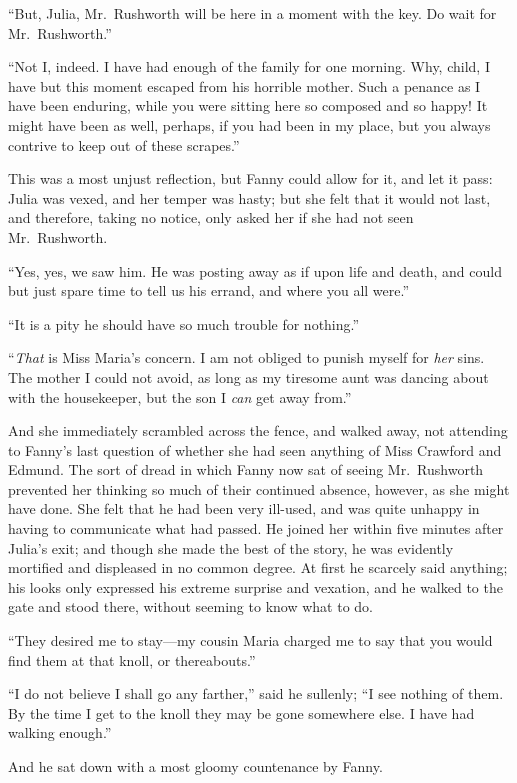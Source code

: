\documentclass{article}
\begin{document}
``But, Julia, Mr.\ Rushworth will be here in a moment
with the key.  Do wait for Mr.\ Rushworth.''

``Not I, indeed.  I have had enough of the family for
one morning.  Why, child, I have but this moment escaped from
his horrible mother.  Such a penance as I have been enduring,
while you were sitting here so composed and so happy!
It might have been as well, perhaps, if you had been in
my place, but you always contrive to keep out of these scrapes.''

This was a most unjust reflection, but Fanny could allow
for it, and let it pass:  Julia was vexed, and her
temper was hasty; but she felt that it would not last,
and therefore, taking no notice, only asked her if she
had not seen Mr.\ Rushworth.

``Yes, yes, we saw him.  He was posting away as if upon
life and death, and could but just spare time to tell us
his errand, and where you all were.''

``It is a pity he should have so much trouble for nothing.''

``\emph{That} is Miss Maria's concern.  I am not obliged
to punish myself for \emph{her} sins.  The mother I could
not avoid, as long as my tiresome aunt was dancing about
with the housekeeper, but the son I \emph{can} get away from.''

And she immediately scrambled across the fence,
and walked away, not attending to Fanny's last question of
whether she had seen anything of Miss Crawford and Edmund.
The sort of dread in which Fanny now sat of seeing
Mr.\ Rushworth prevented her thinking so much of their
continued absence, however, as she might have done.
She felt that he had been very ill-used, and was quite
unhappy in having to communicate what had passed.
He joined her within five minutes after Julia's exit;
and though she made the best of the story, he was evidently
mortified and displeased in no common degree.  At first
he scarcely said anything; his looks only expressed his
extreme surprise and vexation, and he walked to the gate
and stood there, without seeming to know what to do.

``They desired me to stay---my cousin Maria charged me to say
that you would find them at that knoll, or thereabouts.''

``I do not believe I shall go any farther,'' said he sullenly;
``I see nothing of them.  By the time I get to the knoll they
may be gone somewhere else.  I have had walking enough.''

And he sat down with a most gloomy countenance by Fanny.
\end{document}
